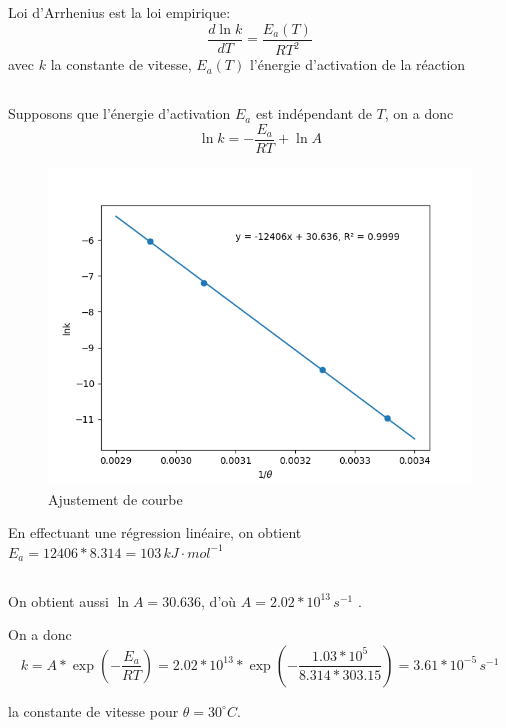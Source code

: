 \documentclass[a4paper,12pt]{book}
\begin{document}
\subsection{}
Loi d’Arrhenius est la loi empirique: 
$$
\frac{d\ln k}{dT}=\frac{E_a(T)}{RT^2}
$$
avec $k$ la constante de vitesse, $E_a(T)$ l’énergie d’activation de la réaction
\subsection{}
Supposons que l’énergie d’activation $E_a$ est indépendant de $T$, on a donc 
$$
\ln k=-\frac{E_a}{RT}+\ln A
$$
\begin{figure}[h]
    \begin{center}
    \includegraphics[scale=0.4]{dm8.png}
    \end{center}
    \caption{Ajustement de courbe}
\end{figure}

En effectuant une régression linéaire, on obtient $\boxed{E_a=12406*8.314=103\,kJ\cdot mol^{-1}}$
\subsection{}
On obtient aussi $\ln A=30.636$, d'où $A=2.02*10^{13}\,s^{-1}$
. 

On a donc 
$$\boxed{k=A*\exp(-\frac{E_a}{RT})=2.02*10^13*\exp(-\frac{1.03*10^5}{8.314*303.15})=3.61*10^{-5}\,s^{-1}}$$
 
la constante de vitesse pour $\theta = 30^\circ C$.
\end{document}
